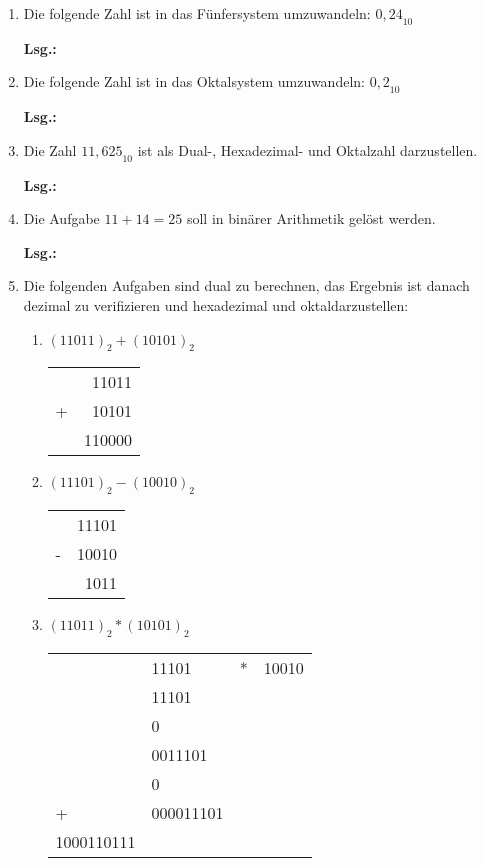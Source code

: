 \documentclass[12pt,a4paper]{scrreprt}
\newcommand{\Lsg}{\par \textbf{Lsg.: \hfill }}
\begin{document}
\begin{enumerate}
\item Die folgende Zahl ist in das Fünfersystem umzuwandeln: ${0,24}_{10}$

\Lsg%

\item Die folgende Zahl ist in das Oktalsystem umzuwandeln: ${0,2}_{10}$

\Lsg%

\item Die Zahl ${11,625}_{10}$ ist als Dual-, Hexadezimal- und Oktalzahl darzustellen.

\Lsg%

\item Die Aufgabe $11+14=25$ soll in binärer Arithmetik gelöst werden.

\Lsg%

\item Die folgenden Aufgaben sind dual zu berechnen, das Ergebnis ist danach dezimal zu verifizieren und hexadezimal und oktaldarzustellen:

\begin{enumerate}
\item $(11011)_2 + (10101)_2$

\begin{tabular}{rr}
 & 11011 \\
+& 10101 \\
\hline
 & 110000
\end{tabular}

\item $(11101)_2 - (10010)_2$

\begin{tabular}{rr}
 & 11101 \\
-& 10010 \\
\hline
 & 1011
\end{tabular}

\item $(11011)_2 * (10101)_2$

\begin{tabular}{llcr}
 & 11101 & * & 10010 \\
 & 11101  \\
 & 0 \\
 & 0011101  \\
 & 0 \\
+& 000011101  \\
\hline 
1000110111
\end{tabular}


\end{enumerate}
\end{enumerate}
\end{document}
